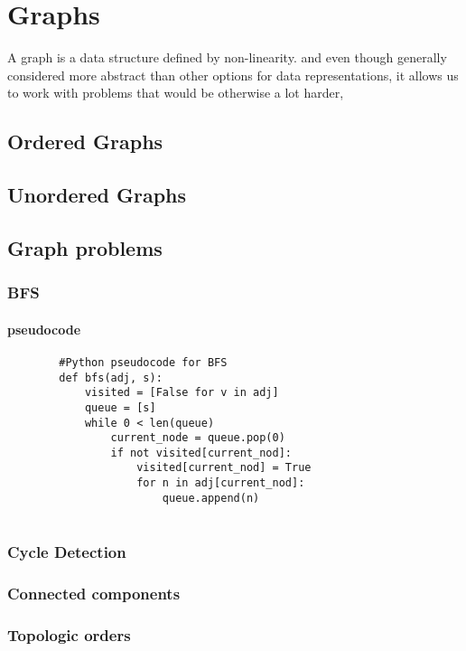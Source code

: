 \documentclass[12pt,a4paper,olive]{bbe}
\begin{document}
	\chapter{Graphs}
	A graph is a data structure defined by non-linearity. and even though
	generally considered more abstract than other options for data representations,
	it allows us to work with problems that would be otherwise a lot harder, 
	\section{Ordered Graphs}
	\section{Unordered Graphs}
	
	\section{Graph problems}
	
	\subsection{BFS}

	\subsubsection{pseudocode}
	\begin{verbatim}
		#Python pseudocode for BFS
		def bfs(adj, s):
		    visited = [False for v in adj]
		    queue = [s]
		    while 0 < len(queue)
		        current_node = queue.pop(0)
		        if not visited[current_nod]:
		            visited[current_nod] = True
		            for n in adj[current_nod]:
		                queue.append(n)
		            
	\end{verbatim}
	\subsection{Cycle Detection}
	\subsection{Connected components}
	\subsection{Topologic orders}
\end{document}
